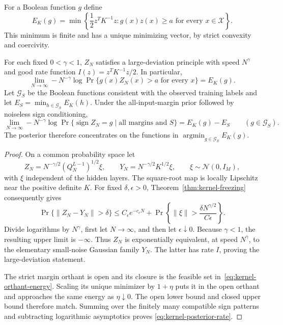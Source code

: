 For a Boolean function $g$ define
\begin{equation}\label{eq:kernel-orthant-energy}
 E_K(g)=\min\left\{\frac12z^TK^{-1}z:
               g(x)z(x)\ge a\text{ for every }x\in\mathcal X\right\}.
\end{equation}
This minimum is finite and has a unique minimizing vector, by strict
convexity and coercivity.

\begin{theorem}
\label{thm:kernel-posterior}
For each fixed $0<\gamma<1$, $Z_N$ satisfies a large-deviation principle
with speed $N^\gamma$ and good rate function
$I(z)=z^TK^{-1}z/2$. In particular,
\begin{equation}\label{eq:kernel-orthant-rate}
 \lim_{N\to\infty}-N^{-\gamma}
 \log\Pr\{g(x)Z_N(x)>a\text{ for every }x\}=E_K(g).
\end{equation}
Let $\mathcal G_S$ be the Boolean functions consistent with the observed
training labels and let $E_S=\min_{h\in\mathcal G_S}E_K(h)$. Under the
all-input-margin prior followed by noiseless sign conditioning,
\begin{equation}\label{eq:kernel-posterior-rate}
 \lim_{N\to\infty}-N^{-\gamma}
 \log\Pr\{\operatorname{sign}Z_N=g\mid\text{all margins and }S\}
 =E_K(g)-E_S\qquad(g\in\mathcal G_S).
\end{equation}
The posterior therefore concentrates on the functions in
$\operatorname*{argmin}_{g\in\mathcal G_S}E_K(g)$.
\end{theorem}

\begin{proof}
On a common probability space let
\[
 Z_N=N^{-\gamma/2}(Q_N^{L-1})^{1/2}\xi,
 \qquad Y_N=N^{-\gamma/2}K^{1/2}\xi,
 \qquad \xi\sim\mathcal N(0,I_M),
\]
with $\xi$ independent of the hidden layers. The square-root map is
locally Lipschitz near the positive definite $K$. For fixed
$\delta,\epsilon>0$, Theorem~\ref{thm:kernel-freezing} consequently gives
\[
 \Pr\{\|Z_N-Y_N\|>\delta\}
 \le C_\epsilon e^{-c_\epsilon N}
   +\Pr\!\left\{\|\xi\|>
          \frac{\delta N^{\gamma/2}}{C\epsilon}\right\}.
\]
Divide logarithms by $N^\gamma$, first let $N\to\infty$, and then let
$\epsilon\downarrow0$. Because $\gamma<1$, the resulting upper limit
is $-\infty$. Thus $Z_N$ is exponentially equivalent, at speed
$N^\gamma$, to the elementary small-noise Gaussian family $Y_N$.
The latter has rate $I$, proving the large-deviation statement.

The strict margin orthant is open and its closure is the feasible set
in~\eqref{eq:kernel-orthant-energy}. Scaling its unique minimizer by
$1+\eta$ puts it in the open orthant and approaches the same energy
as $\eta\downarrow0$. The open lower bound and closed upper bound
therefore match. Summing over the finitely many compatible sign
patterns and subtracting logarithmic asymptotics proves
\eqref{eq:kernel-posterior-rate}.
\end{proof}

